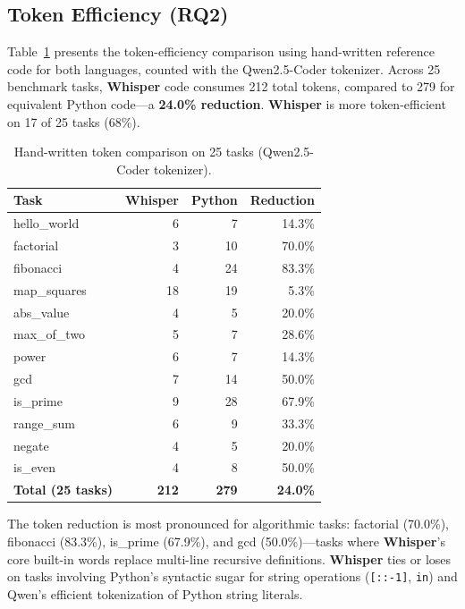 \documentclass[11pt,a4paper]{article}
\begin{document}
\subsection{Token Efficiency (RQ2)}

Table~\ref{tab:token} presents the token-efficiency comparison using
hand-written reference code for both languages, counted with the
Qwen2.5-Coder tokenizer. Across 25 benchmark tasks, \textbf{Whisper}
code consumes 212 total tokens, compared to 279 for equivalent Python
code---a \textbf{24.0\% reduction}. \textbf{Whisper} is more
token-efficient on 17 of 25 tasks (68\%).

\begin{table}[ht]
\centering
\caption{Hand-written token comparison on 25 tasks (Qwen2.5-Coder tokenizer).}
\label{tab:token}
\begin{tabular}{lrrr}
\toprule
\textbf{Task} & \textbf{Whisper} & \textbf{Python} & \textbf{Reduction} \\
\midrule
hello\_world & 6 & 7 & 14.3\% \\
factorial & 3 & 10 & 70.0\% \\
fibonacci & 4 & 24 & 83.3\% \\
map\_squares & 18 & 19 & 5.3\% \\
abs\_value & 4 & 5 & 20.0\% \\
max\_of\_two & 5 & 7 & 28.6\% \\
power & 6 & 7 & 14.3\% \\
gcd & 7 & 14 & 50.0\% \\
is\_prime & 9 & 28 & 67.9\% \\
range\_sum & 6 & 9 & 33.3\% \\
negate & 4 & 5 & 20.0\% \\
is\_even & 4 & 8 & 50.0\% \\
\midrule
\textbf{Total (25 tasks)} & \textbf{212} & \textbf{279} & \textbf{24.0\%} \\
\bottomrule
\end{tabular}
\end{table}

The token reduction is most pronounced for algorithmic tasks: factorial
(70.0\%), fibonacci (83.3\%), is\_prime (67.9\%), and gcd (50.0\%)---tasks
where \textbf{Whisper}'s core built-in words replace multi-line recursive
definitions. \textbf{Whisper} ties or loses on tasks involving Python's
syntactic sugar for string operations (\texttt{[::-1]}, \texttt{in}) and
Qwen's efficient tokenization of Python string literals.
\end{document}

